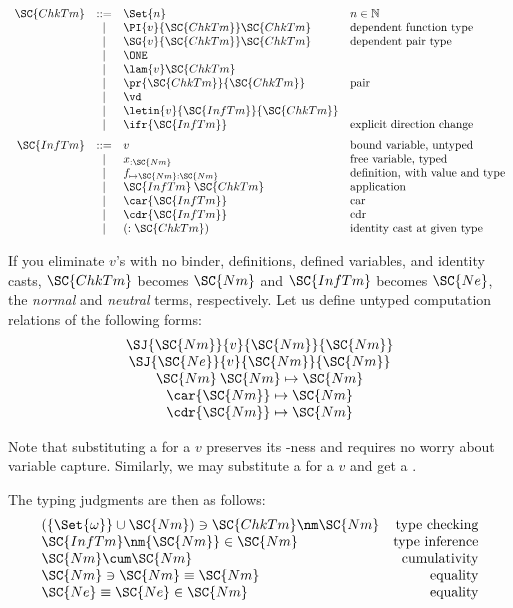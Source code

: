 \documentclass{article}
\begin{document}
\[\begin{array}{rcll}
\SC{ChkTm} & ::= &  \Set{n} & n\in\mathbb{N} \\
  &|& \PI{v}{\SC{ChkTm}}\SC{ChkTm} & \mbox{dependent function type} \\
  &|& \SG{v}{\SC{ChkTm}}\SC{ChkTm} & \mbox{dependent pair type} \\
  &|& \ONE \\
  &|& \lam{v}\SC{ChkTm} \\
  &|& \pr{\SC{ChkTm}}{\SC{ChkTm}} & \mbox{pair}\\
  &|& \vd \\
  &|& \letin{v}{\SC{InfTm}}{\SC{ChkTm}} \\
  &|& \ifr{\SC{InfTm}} & \mbox{explicit direction change}
\medskip \\
\SC{InfTm} & ::= & v & \mbox{bound variable, untyped}\\
  &|& x_{:\SC{Nm}} & \mbox{free variable, typed}\\
  &|& f_{\mapsto\SC{Nm}:\SC{Nm}} & \mbox{definition, with value
    and type}\\
  &|& \SC{InfTm}\:\SC{ChkTm} & \mbox{application} \\
  &|& \car{\SC{InfTm}} & \mbox{car}\\
  &|& \cdr{\SC{InfTm}} & \mbox{cdr}\\
  &|& (:\SC{ChkTm}) & \mbox{identity cast at given type}
\end{array}\]

If you eliminate \(v\)'s with no binder,
definitions, defined variables, and identity casts, \(\SC{ChkTm}\)
becomes \(\SC{Nm}\) and \(\SC{InfTm}\) becomes \(\SC{Ne}\), the
\emph{normal} and \emph{neutral} terms, respectively. Let us define
untyped computation relations of the following forms:
\[\begin{array}{c}
\SJ{\SC{Nm}}{v}{\SC{Nm}}{\SC{Nm}}\\
\SJ{\SC{Ne}}{v}{\SC{Nm}}{\SC{Nm}}\\
\SC{Nm}\:\SC{Nm} \mapsto \SC{Nm}\\
\car{\SC{Nm}} \mapsto \SC{Nm}\\
\cdr{\SC{Nm}} \mapsto \SC{Nm}\\
\end{array}\]

Note that substituting a  for a \(v\) preserves its -ness
and requires no worry about variable capture. Similarly, we may substitute
a  for a \(v\) and get a .

The typing judgments are then as follows:
\[\begin{array}{lr}
(\{\Set{\omega}\}\cup\SC{Nm})\ni\SC{ChkTm}\nm\SC{Nm} & \mbox{type checking}\\
\SC{InfTm}\nm{\SC{Nm}}\in\SC{Nm} & \mbox{type inference}\\
\SC{Nm}\cum\SC{Nm} & \mbox{cumulativity}\\
\SC{Nm}\ni\SC{Nm}\equiv\SC{Nm} &
\mbox{equality} \\
\SC{Ne}\equiv\SC{Ne}\in\SC{Nm} & \mbox{equality} \\
\end{array}\]
\end{document}

